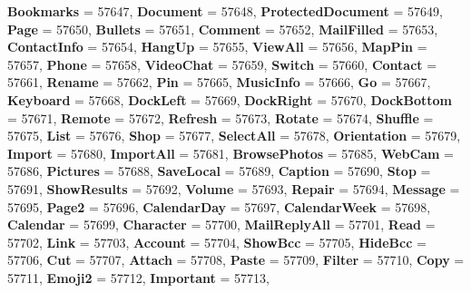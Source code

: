 \begin{DoxyCompactItemize}
{\bfseries Bookmarks} = 57647, 
\newline
{\bfseries Document} = 57648, 
{\bfseries Protected\+Document} = 57649, 
{\bfseries Page} = 57650, 
{\bfseries Bullets} = 57651, 
\newline
{\bfseries Comment} = 57652, 
{\bfseries Mail\+Filled} = 57653, 
{\bfseries Contact\+Info} = 57654, 
{\bfseries Hang\+Up} = 57655, 
\newline
{\bfseries View\+All} = 57656, 
{\bfseries Map\+Pin} = 57657, 
{\bfseries Phone} = 57658, 
{\bfseries Video\+Chat} = 57659, 
\newline
{\bfseries Switch} = 57660, 
{\bfseries Contact} = 57661, 
{\bfseries Rename} = 57662, 
{\bfseries Pin} = 57665, 
\newline
{\bfseries Music\+Info} = 57666, 
{\bfseries Go} = 57667, 
{\bfseries Keyboard} = 57668, 
{\bfseries Dock\+Left} = 57669, 
\newline
{\bfseries Dock\+Right} = 57670, 
{\bfseries Dock\+Bottom} = 57671, 
{\bfseries Remote} = 57672, 
{\bfseries Refresh} = 57673, 
\newline
{\bfseries Rotate} = 57674, 
{\bfseries Shuffle} = 57675, 
{\bfseries List} = 57676, 
{\bfseries Shop} = 57677, 
\newline
{\bfseries Select\+All} = 57678, 
{\bfseries Orientation} = 57679, 
{\bfseries Import} = 57680, 
{\bfseries Import\+All} = 57681, 
\newline
{\bfseries Browse\+Photos} = 57685, 
{\bfseries Web\+Cam} = 57686, 
{\bfseries Pictures} = 57688, 
{\bfseries Save\+Local} = 57689, 
\newline
{\bfseries Caption} = 57690, 
{\bfseries Stop} = 57691, 
{\bfseries Show\+Results} = 57692, 
{\bfseries Volume} = 57693, 
\newline
{\bfseries Repair} = 57694, 
{\bfseries Message} = 57695, 
{\bfseries Page2} = 57696, 
{\bfseries Calendar\+Day} = 57697, 
\newline
{\bfseries Calendar\+Week} = 57698, 
{\bfseries Calendar} = 57699, 
{\bfseries Character} = 57700, 
{\bfseries Mail\+Reply\+All} = 57701, 
\newline
{\bfseries Read} = 57702, 
{\bfseries Link} = 57703, 
{\bfseries Account} = 57704, 
{\bfseries Show\+Bcc} = 57705, 
\newline
{\bfseries Hide\+Bcc} = 57706, 
{\bfseries Cut} = 57707, 
{\bfseries Attach} = 57708, 
{\bfseries Paste} = 57709, 
\newline
{\bfseries Filter} = 57710, 
{\bfseries Copy} = 57711, 
{\bfseries Emoji2} = 57712, 
{\bfseries Important} = 57713, 

\end{DoxyCompactItemize}
